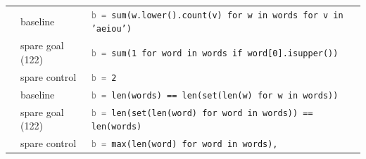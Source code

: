 \begin{table}[p]
\begin{tabular}{l l p{7cm} c}
\midrule
{} & baseline & \texttt{\textcolor{gray}{b =} sum(w.lower().count(v) for w in words for v in 'aeiou')} & \textcolor{ForestGreen}{} \\
 & spare goal (122) & \texttt{\textcolor{gray}{b =} sum(1 for word in words if word[0].isupper())} & \textcolor{BrickRed}{} \\
 & spare control & \texttt{\textcolor{gray}{b =} 2} & \textcolor{BrickRed}{} \\
\midrule
{} & baseline & \texttt{\textcolor{gray}{b =} len(words) == len(set(len(w) for w in words))} & \textcolor{ForestGreen}{} \\
 & spare goal (122) & \texttt{\textcolor{gray}{b =} len(set(len(word) for word in words)) == len(words)} & \textcolor{ForestGreen}{} \\
 & spare control & \texttt{\textcolor{gray}{b =} max(len(word) for word in words),} & \textcolor{BrickRed}{} \\
\bottomrule
\end{tabular}


\end{table}
